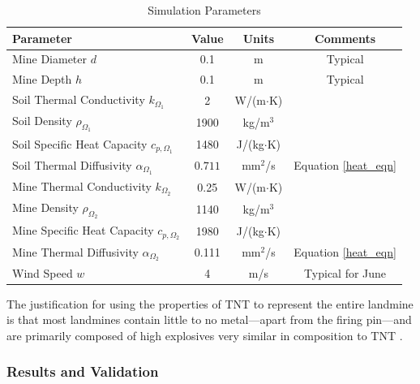         \begin{table}[ht]
        \centering
        \caption{Simulation Parameters}
        \label{tab:properties}
        \begin{tabular}{lccc}
        \hline
        \textbf{Parameter} & \textbf{Value} & \textbf{Units} & \textbf{Comments}\\
        \hline
        Mine Diameter \(d\)       & 0.1     & m    & Typical\\
        Mine Depth \(h\)          & 0.1   & m    & Typical\\
        Soil Thermal Conductivity $k_{\Omega_1}$ & 2  & W/(m$\cdot$K) & \cite{szymanik2011soil}\\
        Soil Density $\rho_{\Omega_1}$     & 1900     & kg/m$^3$ & \cite{szymanik2011soil}\\
        Soil Specific Heat Capacity $c_{p,{\Omega_1}}$  & 1480     & J/(kg$\cdot$K) & \cite{dummyRef1}\\
        Soil Thermal Diffusivity $\alpha_{\Omega_1}$ & $0.711$ & mm$^2$/s    & Equation \ref{heat_eqn}\\
        Mine Thermal Conductivity $k_{\Omega_2}$ & 0.25  & W/(m$\cdot$K) & \cite{szymanik2011soil}\\
        Mine Density $\rho_{\Omega_2}$      & 1140     & kg/m$^3$ & \cite{szymanik2011soil}\\
        Mine Specific Heat Capacity $c_{p,{\Omega_2}}$ & 1980     & J/(kg$\cdot$K) & \cite{szymanik2011soil}\\
        Mine Thermal Diffusivity $\alpha_{\Omega_2}$ & 0.111 & mm$^2$/s    & Equation \ref{heat_eqn}\\
        Wind Speed \(w\)          & 4      & m/s  & Typical for June \tablefootnote{\url{https://weather-and-climate.com/average-monthly-Wind-speed,Kabul,Afghanistan}}\\
        \hline
        \end{tabular}
        \end{table}
    
        The justification for using the properties of TNT to represent the entire landmine is that most landmines contain little to no metal—apart from the firing pin—and are primarily composed of high explosives very similar in composition to TNT \cite{szymanik2011soil}.

    \subsubsection{Results and Validation}
    
